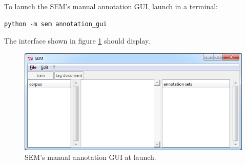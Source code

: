 \documentclass[manual-fr.tex]{subfiles}
\begin{document}
To launch the SEM's manual annotation GUI, launch in a terminal:

\begin{lstlisting}[style=pieceofcode,frame=single]
python -m sem annotation_gui
\end{lstlisting}

The interface shown in figure \ref{fig:annotation_sem-01} should display.

\begin{figure}[ht!]
    \begin{center}
    \includegraphics[scale=0.5]{fr/images/annotation_sem-01.png}
    \end{center}
    \caption{SEM's manual annotation GUI at launch.}
    \label{fig:annotation_sem-01}
\end{figure}
\end{document}
